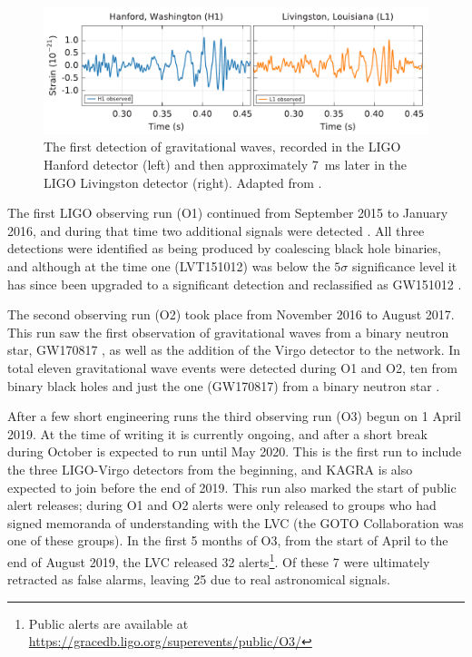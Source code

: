 \begin{colsection}
\begin{colsection}
\begin{figure}[t]
    \begin{center}
        \includegraphics[width=\linewidth]{images/chirp.pdf}
    \end{center}
    \caption[The first detection of gravitational waves]{
        The first detection of gravitational waves, recorded in the LIGO Hanford detector (left) and then approximately \SI{7}{\milli\second} later in the LIGO Livingston detector (right). Adapted from \citet{GW150914}.
        }\label{fig:chirp}
\end{figure}

The first LIGO observing run (O1)  continued from September 2015 to January 2016, and during that time two additional signals were detected \citep{LIGO_O1}. All three detections were identified as being produced by coalescing black hole binaries, and although at the time one (LVT151012) was below the $5\sigma$ significance level it has since been upgraded to a significant detection and reclassified as GW151012 \citep{GW_catalog}.

The second observing run (O2)  took place from November 2016 to August 2017. This run saw the first observation of gravitational waves from a binary neutron star, GW170817 \citep{GW170817}, as well as the addition of the Virgo detector to the network. In total eleven gravitational wave events were detected during O1 and O2, ten from binary black holes and just the one (GW170817) from a binary neutron star \citep{GW_catalog}.

After a few short engineering runs the third observing run (O3)  begun on 1 April 2019. At the time of writing it is currently ongoing, and after a short break during October is expected to run until May 2020. This is the first run to include the three LIGO-Virgo detectors from the beginning, and KAGRA is also expected to join before the end of 2019. This run also marked the start of public alert releases; during O1 and O2 alerts were only released to groups who had signed memoranda of understanding with the LVC (the GOTO Collaboration was one of these groups). In the first 5 months of O3, from the start of April to the end of August 2019, the LVC released 32 alerts\footnote{Public alerts are available at \url{https://gracedb.ligo.org/superevents/public/O3/}}. Of these 7 were ultimately retracted as false alarms, leaving 25 due to real astronomical signals.


\end{colsection}
\end{colsection}
